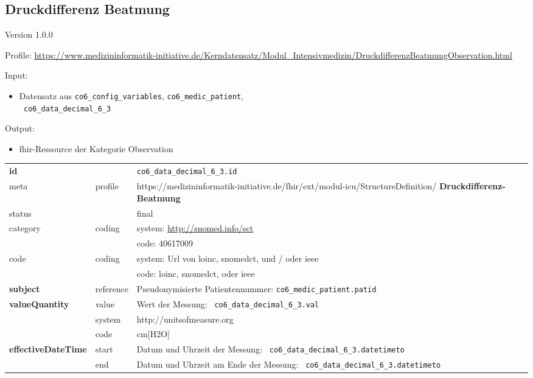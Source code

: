 \subsection{Druckdifferenz Beatmung} 
\noindent Version 1.0.0

\noindent Profile: \url{https://www.medizininformatik-initiative.de/Kerndatensatz/Modul_Intensivmedizin/DruckdifferenzBeatmungObservation.html}

\noindent Input:
\begin{itemize}
	\item Datensatz aus \texttt{co6\_config\_variables}, \texttt{co6\_medic\_patient}, \\ \texttt{
co6\_data\_decimal\_6\_3}
\end{itemize}
Output:
\begin{itemize}
        \item \ac{fhir}-Ressource der Kategorie \glqq Observation\grqq{}
\end{itemize}
\begin{longtable}{|l|l|p{7.5cm}|}
        \hline
        \rowcolor{lightgray} \multicolumn{3}{|l|}{Data Mapping (inhaltlich)} \\ \hline
        \textbf{id} &  & \texttt{co6\_data\_decimal\_6\_3.id} \\ \hline
	meta & profile & https://medizininformatik-initiative.de/fhir/ext/modul-icu/StructureDefinition/\textbf{
Druckdifferenz-Beatmung} \\ \hline 
	status &  & final   \\ \hline 
	category & coding & system: \url{http://snomed.info/sct} \\
\cline{3-3}
	& & code: 40617009 \\ \hline
	code & coding & system: Url von \ac{loinc}, \ac{snomedct}, und / oder \ac{ieee} \\ 
	\cline{3-3} 
	 &  & code: \ac{loinc}, \ac{snomedct}, oder \ac{ieee} \\ \hline
	 \textbf{subject}  & reference & Pseudonymisierte Patientennummer: \texttt{co6\_medic\_patient.patid} \\ \hline
	 \textbf{valueQuantity}  & value & Wert der Messung: \texttt{
co6\_data\_decimal\_6\_3.val} \\
        \cline{2-3}
         & system & http://unitsofmeasure.org \\
         \cline{2-3}
         & code &
cm[H2O]
\\ \hline
     \textbf{effectiveDateTime}  & start & Datum und Uhrzeit der Messung: \texttt{
co6\_data\_decimal\_6\_3.datetimeto} \\
    \cline{2-3}
     & end & Datum und Uhrzeit am Ende der Messung: \texttt{
co6\_data\_decimal\_6\_3.datetimeto} \\ \hline
\end{longtable}


